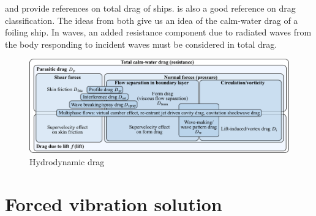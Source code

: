 \documentclass[10pt]{article}
\begin{document}
\citet[Fig. 21.3]{carlton2007} and \citet[Fig. 4]{Chernyshev2023} provide references on total drag of ships.
\citet[Fig. 12.2]{Raymer2012} is also a good reference on drag classification.
The ideas from both give us an idea of the calm-water drag of a foiling ship.
In waves, an added resistance component due to radiated waves from the body responding to incident waves must be considered in total drag.
\begin{figure}[htb!]
    \centering
    \includegraphics[width=\linewidth,clip,trim={0cm 0cm 0cm 0cm}]{modernDragBuildUp_v2.pdf}
    \caption{\label{fig:HydroDrag}Hydrodynamic drag}
\end{figure}
\clearpage
\section{Forced vibration solution}
\end{document}
